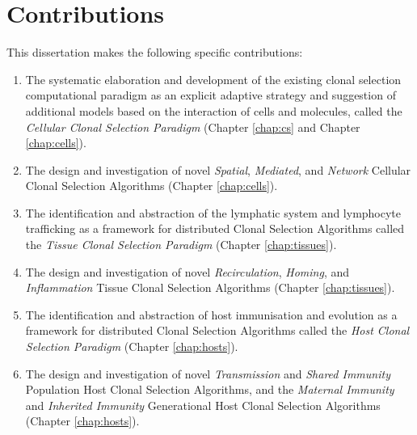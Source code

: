 \section{Contributions}
\label{sec:intro:contributions}
This dissertation makes the following specific contributions:

\begin{enumerate}

	\item The systematic elaboration and development of the existing clonal selection computational paradigm as an explicit adaptive strategy and suggestion of additional models based on the interaction of cells and molecules, called the \emph{Cellular Clonal Selection Paradigm} (Chapter \ref{chap:cs} and Chapter \ref{chap:cells}).
	
	\item The design and investigation of novel \emph{Spatial}, \emph{Mediated}, and \emph{Network} Cellular Clonal Selection Algorithms (Chapter \ref{chap:cells}).
	
	\item The identification and abstraction of the lymphatic system and lymphocyte trafficking as a framework for distributed Clonal Selection Algorithms called the \emph{Tissue Clonal Selection Paradigm} (Chapter \ref{chap:tissues}).
	
	\item The design and investigation of novel \emph{Recirculation}, \emph{Homing}, and \emph{Inflammation} Tissue Clonal Selection Algorithms (Chapter \ref{chap:tissues}).
	
	\item The identification and abstraction of host immunisation and evolution as a framework for distributed Clonal Selection Algorithms called the \emph{Host Clonal Selection Paradigm} (Chapter \ref{chap:hosts}).
	
	\item The design and investigation of novel \emph{Transmission} and \emph{Shared Immunity} Population Host Clonal Selection Algorithms, and the \emph{Maternal Immunity} and \emph{Inherited Immunity} Generational Host Clonal Selection Algorithms (Chapter \ref{chap:hosts}).
		

\end{enumerate}
